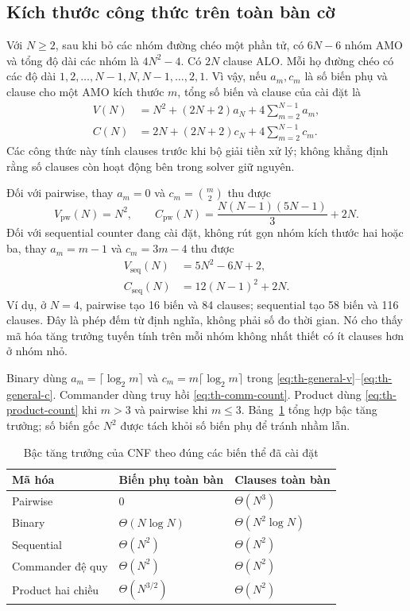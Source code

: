 \subsection{Kích thước công thức trên toàn bàn cờ}

Với $N\geq2$, sau khi bỏ các nhóm đường chéo một phần tử, có $6N-6$
nhóm AMO và tổng độ dài các nhóm là $4N^2-4$. Có $2N$ clause ALO.
Mỗi họ đường chéo có các độ dài $1,2,\ldots,N-1,N,N-1,\ldots,2,1$.
Vì vậy, nếu $a_m,c_m$ là số biến phụ và clause cho một AMO kích thước
$m$, tổng số biến và clause của cài đặt là
\begin{align}
 V(N)&=N^2+(2N+2)a_N+4\sum_{m=2}^{N-1}a_m,\label{eq:th-general-v}\\
 C(N)&=2N+(2N+2)c_N+4\sum_{m=2}^{N-1}c_m.\label{eq:th-general-c}
\end{align}
Các công thức này tính clauses trước khi bộ giải tiền xử lý; không khẳng
định rằng số clauses còn hoạt động bên trong solver giữ nguyên.

Đối với pairwise, thay $a_m=0$ và $c_m=\binom m2$ thu được
\begin{equation}
 V_{\mathrm{pw}}(N)=N^2,\qquad
 C_{\mathrm{pw}}(N)=\frac{N(N-1)(5N-1)}{3}+2N.
 \label{eq:th-pw-board-count}
\end{equation}
Đối với sequential counter đang cài đặt, không rút gọn nhóm kích thước
hai hoặc ba, thay $a_m=m-1$ và $c_m=3m-4$ thu được
\begin{align}
 V_{\mathrm{seq}}(N)&=5N^2-6N+2,\\
 C_{\mathrm{seq}}(N)&=12(N-1)^2+2N.
 \label{eq:th-seq-board-count}
\end{align}
Ví dụ, ở $N=4$, pairwise tạo 16 biến và 84 clauses; sequential tạo
58 biến và 116 clauses. Đây là phép đếm từ định nghĩa, không phải số
đo thời gian. Nó cho thấy mã hóa tăng trưởng tuyến tính trên mỗi nhóm
không nhất thiết có ít clauses hơn ở nhóm nhỏ.

Binary dùng $a_m=\lceil\log_2m\rceil$ và
$c_m=m\lceil\log_2m\rceil$ trong
\eqref{eq:th-general-v}--\eqref{eq:th-general-c}. Commander dùng truy
hồi \eqref{eq:th-comm-count}. Product dùng
\eqref{eq:th-product-count} khi $m>3$ và pairwise khi $m\leq3$.
Bảng~\ref{tab:th-growth} tổng hợp bậc tăng trưởng; số biến gốc $N^2$
được tách khỏi số biến phụ để tránh nhầm lẫn.

\begin{table}[htbp]
 \centering
 \caption{Bậc tăng trưởng của CNF theo đúng các biến thể đã cài đặt}
 \label{tab:th-growth}
 \begin{tabular}{lll}
  \hline
  Mã hóa & Biến phụ toàn bàn & Clauses toàn bàn\\
  \hline
  Pairwise & $0$ & $\Theta(N^3)$\\
  Binary & $\Theta(N\log N)$ & $\Theta(N^2\log N)$\\
  Sequential & $\Theta(N^2)$ & $\Theta(N^2)$\\
  Commander đệ quy & $\Theta(N^2)$ & $\Theta(N^2)$\\
  Product hai chiều & $\Theta(N^{3/2})$ & $\Theta(N^2)$\\
  \hline
 \end{tabular}
\end{table}


